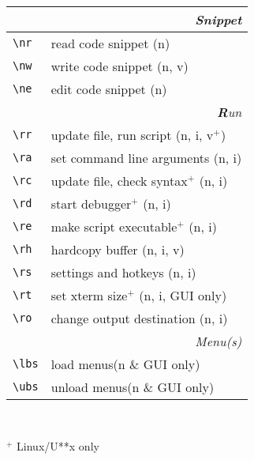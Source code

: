 \documentclass[oneside,12pt,a4paper,DIV18]{scrartcl}
\begin{document}
\begin{center}
\newpage 
\begin{tabular}[]{l}
   \\ [38.2ex]								%
\end{tabular} \\ 
\begin{tabular}[]{|p{11mm}|p{59mm}|}
\hline
\multicolumn{2}{|r|}{\textsl{S\textbf{n}ippet}} \\
\hline \verb'\nr'  & read code snippet          \hfill (n)\\
\hline \verb'\nw'  & write code snippet         \hfill (n, v)\\
\hline \verb'\ne'  & edit code snippet          \hfill (n)\\
\hline
\hline 
\hline
\multicolumn{2}{|r|}{\textsl{\textbf{R}un}} \\
\hline \verb'\rr'  & update file, run script    		\hfill (n, i, v$^+$)\\
\hline \verb'\ra'  & set command line arguments 		\hfill (n, i)\\
\hline \verb'\rc'  & update file, check syntax$^+$  \hfill (n, i)\\
\hline \verb'\rd'  & start debugger$^+$             \hfill (n, i)\\
\hline \verb'\re'  & make script executable$^+$     \hfill (n, i)\\
\hline \verb'\rh'  & hardcopy buffer            		\hfill (n, i, v)\\
\hline \verb'\rs'  & settings and hotkeys       		\hfill (n, i)\\
\hline \verb'\rt'  & set xterm size$^+$             \hfill (n, i, GUI only)\\
\hline \verb'\ro'  & change output destination  		\hfill (n, i)\\
\hline
\hline
\multicolumn{2}{|r|}{\textsl{Menu(s)}}\\
\hline \verb'\lbs'  & load    menus\hfill \scriptsize{(n \& GUI only)}\\
\hline \verb'\ubs'  & unload  menus\hfill \scriptsize{(n \& GUI only)}\\
\hline 
\end{tabular} \\ [5.0ex]
\vfill
\begin{flushleft}
\hspace{5mm}$^+$ \footnotesize{Linux/U**x only}
\end{flushleft}
\end{center}
\end{document}
